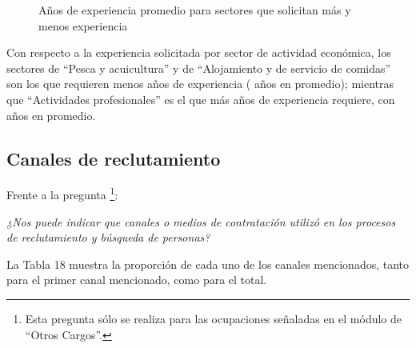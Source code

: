 \documentclass[
  11pt,
]{article}
\begin{document}
\begin{figure}[H]

\caption{\label{fig-top_and_bottom}Años de experiencia promedio para
sectores que solicitan más y menos experiencia}


\end{figure}%

Con respecto a la experiencia solicitada por sector de actividad
económica, los sectores de ``Pesca y acuicultura'' y de ``Alojamiento y
de servicio de comidas'' son los que requieren menos años de experiencia
( años en promedio); mientras que ``Actividades
profesionales'' es el que más años de experiencia requiere, con
 años en promedio.

\subsection{Canales de reclutamiento}\label{canales-de-reclutamiento}

Frente a la pregunta \footnote{Esta pregunta sólo se realiza para las
  ocupaciones señaladas en el módulo de ``Otros Cargos''.}:

\emph{¿Nos puede indicar que canales o medios de contratación utilizó en
los procesos de reclutamiento y búsqueda de personas?}

La Tabla 18 muestra la proporción de cada uno de los canales
mencionados, tanto para el primer canal mencionado, como para el total.
\end{document}

